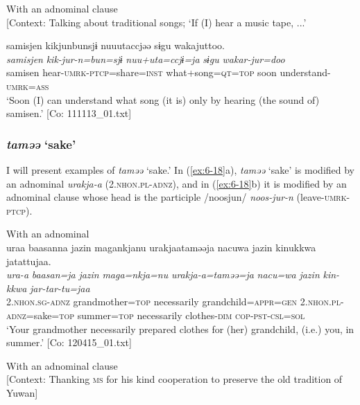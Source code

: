 \ex With an adnominal clause\\{}
[Context: Talking about traditional songs; {\TM} ‘If (I) hear a music tape, ...’

{\TM}
\glll samisjen  kikjunbunsjɨ  nuuutaccjəə     sɨgu  wakajuttoo.\\
      \textit{samisjen}  \textit{kik-jur-n=bun=sjɨ}  \textit{nuu+uta=ccjɨ=ja} \textit{sɨgu}  \textit{wakar-jur=doo}\\
      samisen  hear-\textsc{umrk}-\textsc{ptcp}=share=\textsc{inst}  what+song=\textsc{qt}=\textsc{top}      soon  understand-\textsc{umrk}=\textsc{ass}\\
\glt ‘Soon (I) can understand what song (it is) only by hearing (the sound of) samisen.’ [Co: 111113\_01.txt]
\z
\z

\subsubsection{\textit{taməə} ‘sake’}

I will present examples of \textit{taməə} ‘sake.’ In (\ref{ex:6-18}a), \textit{taməə} ‘sake’ is modified by an adnominal \textit{urakja-a} (2.\textsc{nhon}.\textsc{pl}-\textsc{adnz}), and in (\ref{ex:6-18}b) it is modified by an adnominal clause whose head is the participle /noosjun/ \textit{noos-jur-n} (leave-\textsc{umrk}-\textsc{ptcp}).

\ea\label{ex:6-18}
\ea With an adnominal\\
{\TM}
\glll  uraa  baasanna  jazin  magankjanu  urakjaataməəja  {\textbar}nacuwa{\textbar}  jazin      kinukkwa  jatattujaa.\\
\textit{ura-a}  \textit{baasan=ja}  \textit{jazin}  \textit{maga=nkja=nu}     \textit{urakja-a=taməə=ja}  \textit{nacu=wa}  \textit{jazin}     \textit{kin-kkwa}  \textit{jar-tar-tu=jaa} \\
2.\textsc{nhon}.\textsc{sg}-\textsc{adnz}  grandmother=\textsc{top}  necessarily  grandchild=\textsc{appr}=\textsc{gen}   2.\textsc{nhon}.\textsc{pl}-\textsc{adnz}=sake=\textsc{top}  summer=\textsc{top}  necessarily clothes-\textsc{dim}  \textsc{cop}-\textsc{pst}-\textsc{csl}=\textsc{sol}\\
\glt ‘Your grandmother necessarily prepared clothes for (her) grandchild, (i.e.) you, in summer.’ [Co: 120415\_01.txt]
\z

\ex With an adnominal clause\\{}
[Context: Thanking \textsc{ms} for his kind cooperation to preserve the old tradition of Yuwan]


